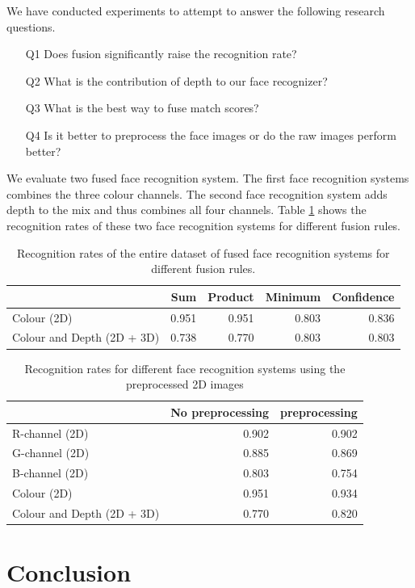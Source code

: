\documentclass[]{article}
\begin{document}
We have conducted experiments to attempt to answer the following research questions.
\begin{itemize}
	\item[Q1] Does fusion significantly raise the recognition rate?
	\item[Q2] What is the contribution of depth to our face recognizer?
	\item[Q3] What is the best way to fuse match scores?
	\item[Q4] Is it better to preprocess the face images or do the raw images perform better?
\end{itemize}

We evaluate two fused face recognition system. The first face recognition systems combines the three colour channels. The second face recognition system adds depth to the mix and thus combines all four channels. Table \ref{tab:fusion-rules} shows the recognition rates of these two face recognition systems for different fusion rules.
\begin{table}
	\centering
	\begin{tabular}{lrrrr}
		\toprule
		& Sum & Product & Minimum & Confidence\\
		\midrule
		Colour (2D) & 0.951 & 0.951 & 0.803 & 0.836\\
		Colour and Depth (2D + 3D) & 0.738 & 0.770 & 0.803 & 0.803 \\
		\bottomrule
	\end{tabular}
	\caption{Recognition rates of the entire dataset of fused face recognition systems for different fusion rules.}
	\label{tab:fusion-rules}
\end{table}



\begin{table}
	\centering
	\begin{tabular}{lrr}
		\toprule
			& No preprocessing & preprocessing\\
		\midrule
		R-channel (2D) & 0.902& 0.902\\
		G-channel (2D) & 0.885& 0.869 \\
		B-channel (2D) & 0.803& 0.754  \\
		Colour (2D) & 0.951& 0.934\\
		Colour and Depth (2D + 3D) & 0.770 & 0.820\\
		\bottomrule
	\end{tabular}
	\caption{Recognition rates for different face recognition systems using the preprocessed 2D images}
	\label{tab:preprocess-rr}
\end{table}
\section{Conclusion}


\end{document}
